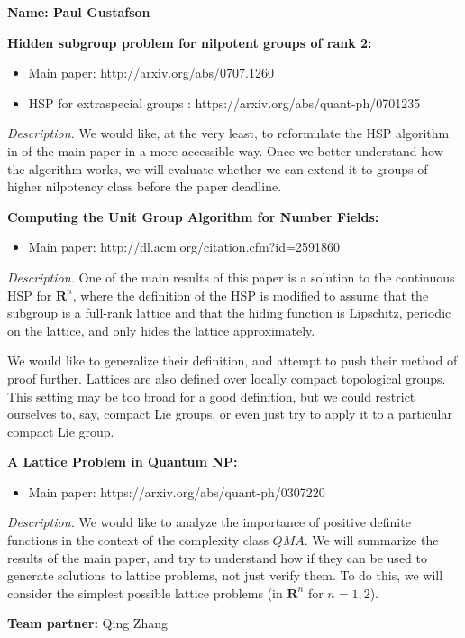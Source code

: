 \documentclass{article}
\begin{document}
\noindent\textbf{Name: Paul Gustafson}
\medskip

\noindent\textbf{Hidden subgroup problem for nilpotent groups of rank 2:} 


\begin{itemize}
\item Main paper:  http://arxiv.org/abs/0707.1260
\item HSP for extraspecial groups : https://arxiv.org/abs/quant-ph/0701235
\end{itemize}

\emph{Description.} We would like, at the very least, to reformulate the HSP algorithm in
of the main paper in a more accessible way.  Once we better understand how the algorithm works, 
we will evaluate whether we can extend it to groups of higher nilpotency class before the paper deadline.

\medskip

\noindent\textbf{Computing the Unit Group Algorithm for Number Fields:}

\begin{itemize}
\item Main paper:  http://dl.acm.org/citation.cfm?id=2591860
\end{itemize}

\emph{Description.} One of the main results of this paper is a solution to the
continuous HSP for $\mathbf{R}^n$, where the definition of the HSP is modified to assume that
the subgroup is a full-rank lattice and that the hiding function is Lipschitz,
periodic on the lattice, and only hides the lattice approximately.   

We would like to generalize their definition, and attempt to push their method of proof further.  
Lattices are also defined over locally compact topological groups.  This setting may be too broad for a good definition,
but we could restrict ourselves to, say, compact Lie groups, or even just try to apply it to a particular compact Lie group.
\medskip

\noindent\textbf{A Lattice Problem in Quantum NP:}


\begin{itemize}
\item Main paper:  https://arxiv.org/abs/quant-ph/0307220
\end{itemize}

\emph{Description.} We would like to analyze the importance of positive definite functions
in the context of the complexity class $QMA$.  We will summarize the results of the main paper,
and try to understand how if they can be used to generate solutions to lattice problems, not
just verify them.  To do this, we will consider the simplest possible lattice problems (in 
$\mathbf{R}^n$ for $n =1,2$).

\medskip

\noindent\textbf{Team partner:} Qing Zhang





 
\end{document}
